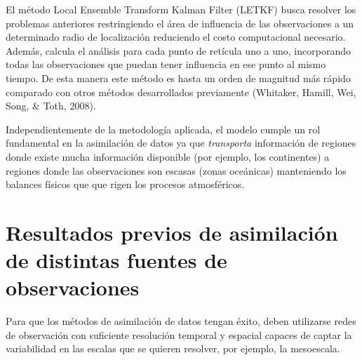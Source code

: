 \documentclass[12pt,twoside]{reedthesis}
\begin{document}
El método Local Ensemble Transform Kalman Filter (LETKF) busca resolver los problemas anteriores restringiendo el área de influencia de las observaciones a un determinado radio de localización reduciendo el costo computacional necesario. Además, calcula el análisis para cada punto de retícula uno a uno, incorporando todas las observaciones que puedan tener influencia en ese punto al mismo tiempo. De esta manera este método es hasta un orden de magnitud más rápido comparado con otros métodos desarrollados previamente (Whitaker, Hamill, Wei, Song, \& Toth, 2008).

Independientemente de la metodología aplicada, el modelo cumple un rol fundamental en la asimilación de datos ya que \emph{transporta} información de regiones donde existe mucha información disponible (por ejemplo, los continentes) a regiones donde las observaciones son escasas (zonas oceánicas) manteniendo los balances físicos que que rigen los procesos atmosféricos.

\hypertarget{resultados-previos-de-asimilaciuxf3n-de-distintas-fuentes-de-observaciones}{%
\section{Resultados previos de asimilación de distintas fuentes de observaciones}\label{resultados-previos-de-asimilaciuxf3n-de-distintas-fuentes-de-observaciones}}

Para que los métodos de asimilación de datos tengan éxito, deben utilizarse redes de observación con suficiente resolución temporal y espacial capaces de captar la variabilidad en las escalas que se quieren resolver, por ejemplo, la mesoescala.
\end{document}

